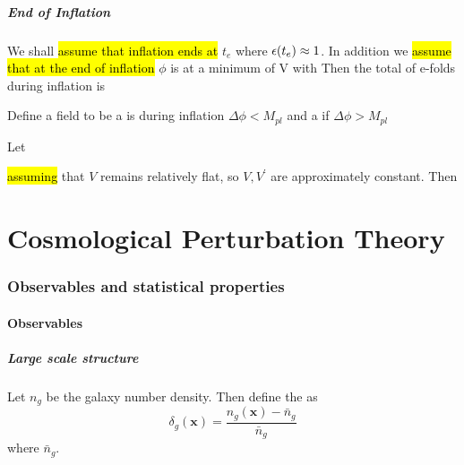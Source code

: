 \documentclass{article}
\begin{document}
\subsubsection*{End of Inflation}
We shall \hl{assume that inflation ends at} $t_e$ where $\epsilon(t_e)\approx 1$. In addition we \hl{assume that at the end of inflation} $\phi$ is at a minimum of V with 
Then the total of e-folds during inflation is 

\begin{definition}
Define a field to be a  is during inflation $\Delta \phi < M_{pl}$ and a  if $\Delta \phi > M_{pl}$
\end{definition}

\begin{definition}
Let 
\end{definition}
\hl{assuming} that $V$ remains relatively flat, so $V,V^\prime$ are approximately constant. Then 

\part{Cosmological Perturbation Theory}
\section{Observables and statistical properties}
\subsection{Observables}
\subsubsection*{Large scale structure}
\begin{definition}
Let $n_g$ be the galaxy number density. Then define the  as 
\[
\delta_g(\bm{x}) = \frac{n_g(\bm{x})-\bar{n}_g}{\bar{n}_g}
\]
where $\bar{n}_g$. 
\end{definition}
\end{document}
